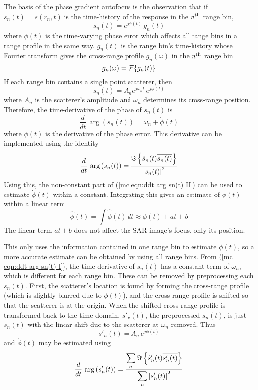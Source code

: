 The basis of the phase gradient autofocus is the observation that if
$s_n(t)=s(r_n,t)$ is the time-history of the response in the $n^{\rm th}$
range bin,
\begin{equation}
s_n(t)=e^{j\phi(t)}\,g_n(t)
\end{equation}
where $\phi(t)$ is the time-varying phase error which affects all range bins
in a range profile in the same way.  $g_n(t)$ is the range bin's time-history whose Fourier
transform gives the cross-range profile $g_n(\omega)$ in the $n^{\rm th}$ 
range bin
\begin{equation}
g_n(\omega)={\cal F}\{g_n(t)\}
\end{equation}
If each range bin contains a single point scatterer, then
\begin{equation}
s_n(t)=A_ne^{j\omega_nt}\,e^{j\phi(t)}
\end{equation}
where $A_n$ is the scatterer's amplitude and $\omega_n$ determines its
cross-range position.  Therefore, the time-derivative of the phase of
$s_n(t)$ is
\begin{equation}\label{mc eqn:ddt arg sn(t) I}
\frac{d}{dt}\,\arg\left(s_n(t)\right)=\omega_n+\dot{\phi}(t)
\end{equation}
where $\dot{\phi}(t)$ is the derivative of the phase error.  This derivative
can be implemented using the identity
\begin{equation}\label{mc eqn:ddt arg sn(t) II}
\frac{d}{dt}\,\arg\left(s_n(t)\right)=
\frac{\Im\left\{\dot{s}_n(t)\overline{s_n(t)}\right\}}{\left|s_n(t)\right|^2}
\end{equation}
Using this, the non-constant part of (\ref{mc eqn:ddt arg sn(t) II}) can be
used to estimate $\dot{\phi}(t)$ within a constant.  Integrating this
gives an estimate of $\phi(t)$ within a linear term
\begin{equation}
\widehat{\phi}(t)=\int\widehat{\dot{\phi}}(t)\,dt\approx \phi(t)+at+b
\end{equation}
The linear term $at+b$ does not affect the SAR image's focus, only its
position.

This only uses the information contained in one range bin to estimate
$\phi(t)$, so a more accurate estimate can be obtained by using all range
bins.  From (\ref{mc eqn:ddt arg sn(t) I}), the time-derivative of $s_n(t)$
has a constant term of $\omega_n$, which is different for each range bin.
These can be removed by preprocessing each $s_n(t)$.  First, the scatterer's
location is found by forming the cross-range profile (which is slightly
blurred due to $\phi(t)$), and the cross-range profile is shifted so that
the scatterer is at the origin.  When the shifted cross-range profile is
transformed back to the time-domain, $s'_n(t)$, the preprocessed $s_n(t)$,
is just $s_n(t)$ with the linear shift due to the scatterer at $\omega_n$
removed.  Thus 
\begin{equation}
s'_n(t)=A_n\,e^{j\phi(t)}
\end{equation}
and $\dot{\phi}(t)$ may be estimated using
\begin{equation}\label{mc eqn:phidot sum}
\frac{d}{dt}\,\arg\left(s'_n(t)\right)=
\frac{\displaystyle\sum_n\Im\left\{\dot{s}'_n(t)\overline{s'_n(t)}\right\}}
{\displaystyle\sum_n\left|s'_n(t)\right|^2}
\end{equation}


